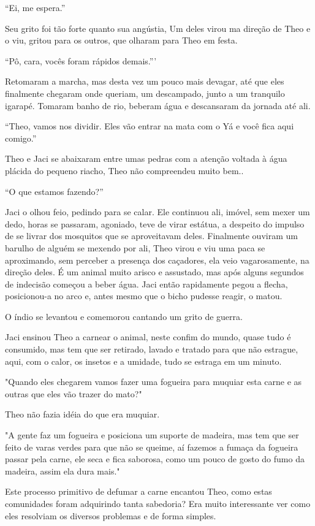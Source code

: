 ``Ei, me espera.''

Seu grito foi tão forte quanto sua angústia, Um deles virou ma direção
de Theo e o viu, gritou para os outros, que olharam para Theo em festa.

``Pô, cara, vocês foram rápidos demais.'''

Retomaram a marcha, mas desta vez um pouco mais devagar, até que eles
finalmente chegaram onde queriam, um descampado, junto a um tranquilo
igarapé. Tomaram banho de rio, beberam água e descansaram da jornada até
ali.

``Theo, vamos nos dividir. Eles vão entrar na mata com o Yá e você fica
aqui comigo.''

Theo e Jaci se abaixaram entre umas pedras com a atenção voltada à água
plácida do pequeno riacho, Theo não compreendeu muito bem..

``O que estamos fazendo?''

Jaci o olhou feio, pedindo para se calar. Ele continuou ali, imóvel, sem
mexer um dedo, horas se passaram, agoniado, teve de virar estátua, a
despeito do impulso de se livrar dos mosquitos que se aproveitavam
deles. Finalmente ouviram um barulho de alguém se mexendo por ali, Theo
virou e viu uma paca se aproximando, sem perceber a presença dos
caçadores, ela veio vagarosamente, na direção deles. É um animal muito
arisco e assustado, mas após alguns segundos de indecisão começou a
beber água. Jaci então rapidamente pegou a flecha, posicionou-a no arco
e, antes mesmo que o bicho pudesse reagir, o matou.

O índio se levantou e comemorou cantando um grito de guerra.

Jaci ensinou Theo a carnear o animal, neste confim do mundo, quase tudo
é consumido, mas tem que ser retirado, lavado e tratado para que não
estrague, aqui, com o calor, os insetos e a umidade, tudo se estraga em
um minuto.

"Quando eles chegarem vamos fazer uma fogueira para muquiar esta carne e
as outras que eles vão trazer do mato?"

Theo não fazia idéia do que era muquiar.

"A gente faz um fogueira e posiciona um suporte de madeira, mas tem que
ser feito de varas verdes para que não se queime, aí fazemos a fumaça da
fogueira passar pela carne, ele seca e fica saborosa, como um pouco de
gosto do fumo da madeira, assim ela dura mais."

Este processo primitivo de defumar a carne encantou Theo, como estas
comunidades foram adquirindo tanta sabedoria? Era muito interessante ver
como eles resolviam os diversos problemas e de forma simples.

